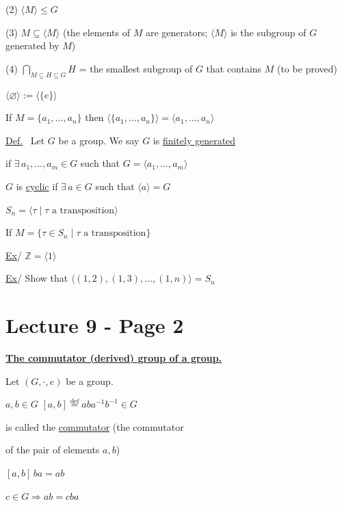 \noindent (2) $\langle M\rangle \leq G$

\noindent (3) $M\subseteq \langle M\rangle$ \quad (the elements of $M$ are generators; $\langle M\rangle$ is the subgroup of $G$ generated by $M$)

\noindent (4) $\displaystyle\bigcap_{M\subseteq H\subseteq G} H$ = the smallest subgroup of $G$ that contains $M$ \quad (to be proved)

\bigskip
\noindent $\langle\varnothing\rangle := \langle\{e\}\rangle$

\bigskip
\noindent If $M=\{a_1,\ldots,a_n\}$ then $\langle\{a_1,\ldots,a_n\}\rangle = \langle a_1,\ldots,a_n\rangle$

\bigskip
\noindent\underline{Def.} \ Let $G$ be a group. We say $G$ is \underline{finitely generated}

\noindent if $\exists\,a_1,\ldots,a_m\in G$ such that $G=\langle a_1,\ldots,a_m\rangle$

\bigskip
\noindent $G$ is \underline{cyclic} if $\exists\,a\in G$ such that $\langle a\rangle=G$

\bigskip
\noindent $S_n = \langle \tau \mid \tau\text{ a transposition}\rangle$

\noindent If $M=\{\tau\in S_n \mid \tau \text{ a transposition}\}$

\bigskip
\noindent\underline{Ex}/ \quad $\mathbb{Z} = \langle 1\rangle$

\bigskip
\noindent\underline{Ex}/ \quad Show that $\big\langle (1,2),(1,3),\ldots,(1,n)\big\rangle = S_n$

% 



\section*{Lecture 9 - Page 2}


\noindent\underline{\textbf{The commutator (derived) group of a group.}}

\bigskip
\noindent Let $(G,\cdot,e)$ be a group.

\noindent $a,b\in G$ \quad $[a,b] \overset{\text{def}}{=} aba^{-1}b^{-1}\in G$

\noindent is called the \underline{commutator} (the commutator

\noindent of the pair of elements $a,b$)

\bigskip
\noindent $[a,b]\,ba = ab$

\noindent $c\in G \Rightarrow ab=cba$

